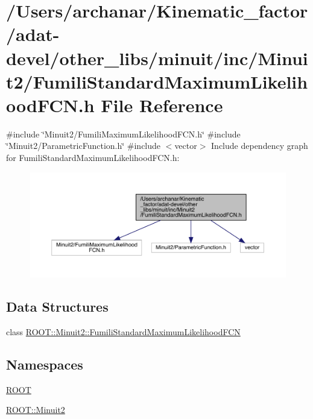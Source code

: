 \hypertarget{adat-devel_2other__libs_2minuit_2inc_2Minuit2_2FumiliStandardMaximumLikelihoodFCN_8h}{}\section{/\+Users/archanar/\+Kinematic\+\_\+factor/adat-\/devel/other\+\_\+libs/minuit/inc/\+Minuit2/\+Fumili\+Standard\+Maximum\+Likelihood\+F\+CN.h File Reference}
\label{adat-devel_2other__libs_2minuit_2inc_2Minuit2_2FumiliStandardMaximumLikelihoodFCN_8h}
{\ttfamily \#include \char`\"{}Minuit2/\+Fumili\+Maximum\+Likelihood\+F\+C\+N.\+h\char`\"{}}\newline
{\ttfamily \#include \char`\"{}Minuit2/\+Parametric\+Function.\+h\char`\"{}}\newline
{\ttfamily \#include $<$vector$>$}\newline
Include dependency graph for Fumili\+Standard\+Maximum\+Likelihood\+F\+C\+N.\+h\+:
\nopagebreak
\begin{figure}[H]
\begin{center}
\leavevmode
\includegraphics[width=350pt]{d0/daf/adat-devel_2other__libs_2minuit_2inc_2Minuit2_2FumiliStandardMaximumLikelihoodFCN_8h__incl}
\end{center}
\end{figure}
\subsection*{Data Structures}
\begin{DoxyCompactItemize}
\item 
class \mbox{\hyperlink{classROOT_1_1Minuit2_1_1FumiliStandardMaximumLikelihoodFCN}{R\+O\+O\+T\+::\+Minuit2\+::\+Fumili\+Standard\+Maximum\+Likelihood\+F\+CN}}
\end{DoxyCompactItemize}
\subsection*{Namespaces}
\begin{DoxyCompactItemize}
\item 
 \mbox{\hyperlink{namespaceROOT}{R\+O\+OT}}
\item 
 \mbox{\hyperlink{namespaceROOT_1_1Minuit2}{R\+O\+O\+T\+::\+Minuit2}}
\end{DoxyCompactItemize}
